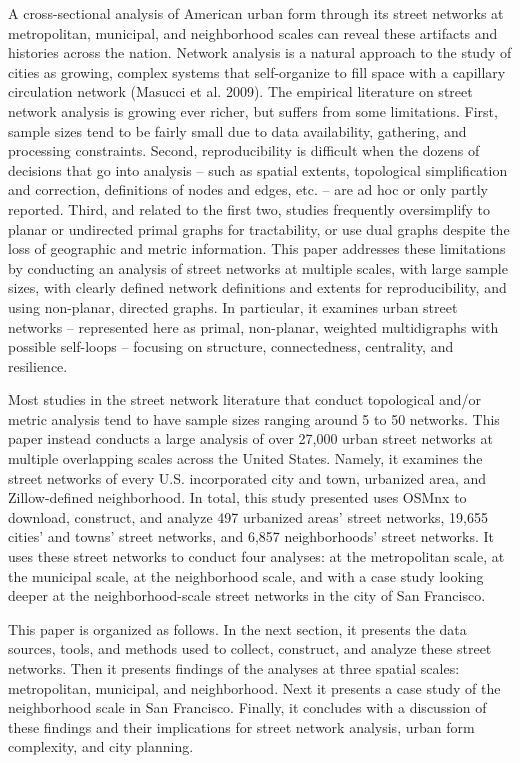 \documentclass[Afour,sageh,times]{sage/sagej}
\begin{document}
A cross-sectional analysis of American urban form through its street networks at metropolitan, municipal, and neighborhood scales can reveal these artifacts and histories across the nation. Network analysis is a natural approach to the study of cities as growing, complex systems that self-organize to fill space with a capillary circulation network (Masucci et al. 2009). The empirical literature on street network analysis is growing ever richer, but suffers from some limitations. First, sample sizes tend to be fairly small due to data availability, gathering, and processing constraints. Second, reproducibility is difficult when the dozens of decisions that go into analysis – such as spatial extents, topological simplification and correction, definitions of nodes and edges, etc. – are ad hoc or only partly reported. Third, and related to the first two, studies frequently oversimplify to planar or undirected primal graphs for tractability, or use dual graphs despite the loss of geographic and metric information. This paper addresses these limitations by conducting an analysis of street networks at multiple scales, with large sample sizes, with clearly defined network definitions and extents for reproducibility, and using non-planar, directed graphs. In particular, it examines urban street networks – represented here as primal, non-planar, weighted multidigraphs with possible self-loops – focusing on structure, connectedness, centrality, and resilience.

Most studies in the street network literature that conduct topological and/or metric analysis tend to have sample sizes ranging around 5 to 50 networks. This paper instead conducts a large analysis of over 27,000 urban street networks at multiple overlapping scales across the United States. Namely, it examines the street networks of every U.S. incorporated city and town, urbanized area, and Zillow-defined neighborhood. In total, this study presented uses OSMnx to download, construct, and analyze 497 urbanized areas' street networks, 19,655 cities' and towns' street networks, and 6,857 neighborhoods' street networks. It uses these street networks to conduct four analyses: at the metropolitan scale, at the municipal scale, at the neighborhood scale, and with a case study looking deeper at the neighborhood-scale street networks in the city of San Francisco.

This paper is organized as follows. In the next section, it presents the data sources, tools, and methods used to collect, construct, and analyze these street networks. Then it presents findings of the analyses at three spatial scales: metropolitan, municipal, and neighborhood. Next it presents a case study of the neighborhood scale in San Francisco. Finally, it concludes with a discussion of these findings and their implications for street network analysis, urban form complexity, and city planning.
\end{document}
